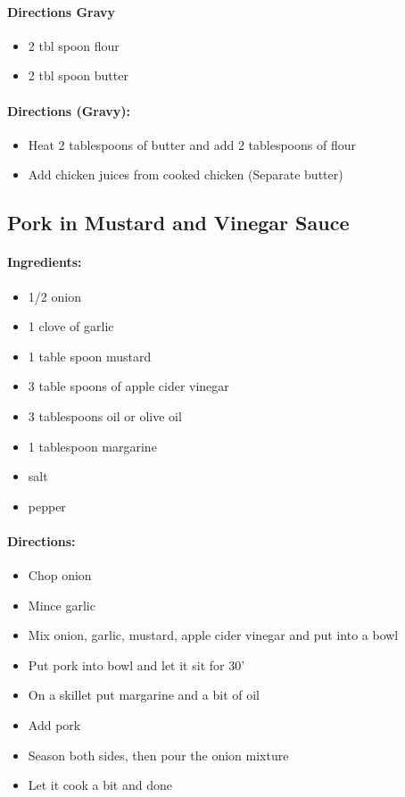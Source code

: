 \documentclass{article}
\begin{document}
\paragraph{Directions Gravy}
\begin{itemize}
	\item 2 tbl spoon flour
	\item 2 tbl spoon butter
\end{itemize}

\paragraph{Directions (Gravy):}
\begin{itemize}
	\item Heat 2 tablespoons of butter and add 2 tablespoons of flour
	\item Add chicken juices from cooked chicken (Separate butter)
\end{itemize}

\subsection{Pork in Mustard and Vinegar Sauce}

\paragraph{Ingredients:}

\begin{itemize}
	\item 1/2 onion
	\item 1 clove of garlic
	\item 1 table spoon mustard
	\item 3 table spoons of apple cider vinegar
	\item 3 tablespoons oil or olive oil
	\item 1 tablespoon margarine
	\item salt
	\item pepper
\end{itemize}

\paragraph{Directions:}
\begin{itemize}
	\item Chop onion
	\item Mince garlic
	\item Mix onion, garlic, mustard, apple cider vinegar and put into a bowl
	\item Put pork into bowl and let it sit for 30'
	\item On a skillet put margarine and a bit of oil
	\item Add pork
	\item Season both sides, then pour the onion mixture
	\item Let it cook a bit and done
\end{itemize}
\end{document}
